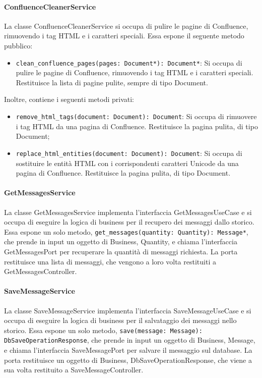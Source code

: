 \paragraph{ConfluenceCleanerService}
\label{sec:confluence_cleaner_service}
La classe ConfluenceCleanerService si occupa di pulire le pagine di Confluence, rimuovendo i tag HTML e i caratteri speciali. Essa espone il seguente metodo pubblico:
\begin{itemize}
    \item \texttt{clean\_confluence\_pages(pages: Document*): Document*}: Si occupa di pulire le pagine di Confluence, rimuovendo i tag HTML e i caratteri speciali. Restituisce la lista di pagine pulite, sempre di tipo Document.
\end{itemize}
Inoltre, contiene i seguenti metodi privati:
\begin{itemize}
    \item \texttt{remove\_html\_tags(document: Document): Document}: Si occupa di rimuovere i tag HTML da una pagina di Confluence. Restituisce la pagina pulita, di tipo Document;
    \item \texttt{replace\_html\_entities(document: Document): Document}: Si occupa di sostituire le entità HTML con i corrispondenti caratteri Unicode da una pagina di Confluence. Restituisce la pagina pulita, di tipo Document.
\end{itemize}

\paragraph{GetMessagesService}
\label{sec:get_messages_service}
La classe GetMessagesService implementa l'interfaccia GetMessagesUseCase e si occupa di eseguire la logica di business per il recupero dei messaggi dallo storico. Essa espone un solo metodo, \texttt{get\_messages(quantity: Quantity): Message*}, che prende in input un oggetto di Business, Quantity, e chiama l'interfaccia GetMessagesPort per recuperare la quantità di messaggi richiesta. La porta restituisce una lista di messaggi, che vengono a loro volta restituiti a GetMessagesController.

\paragraph{SaveMessageService}
\label{sec:save_message_service}
La classe SaveMessageService implementa l'interfaccia SaveMessageUseCase e si occupa di eseguire la logica di business per il salvataggio dei messaggi nello storico. Essa espone un solo metodo, \texttt{save(message: Message): DbSaveOperationResponse}, che prende in input un oggetto di Business, Message, e chiama l'interfaccia SaveMessagePort per salvare il messaggio sul database. La porta restituisce un oggetto di Business, DbSaveOperationResponse, che viene a sua volta restituito a SaveMessageController.

